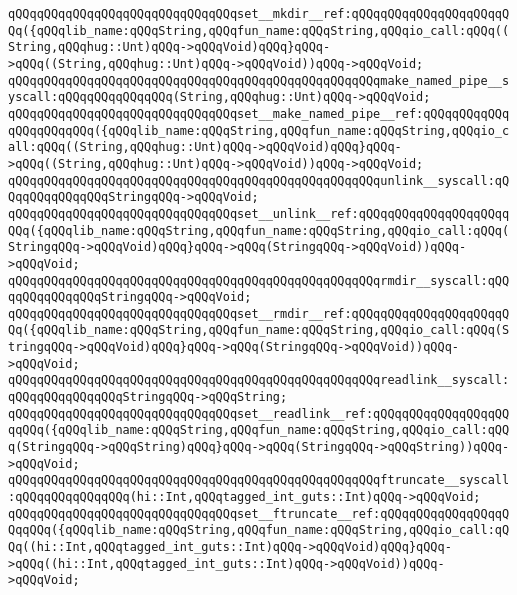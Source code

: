 \verb|qQQqqQQqqQQqqQQqqQQqqQQqqQQqqQQqset__mkdir__ref:qQQqqQQqqQQqqQQqqQQqqQQq({qQQqlib_name:qQQqString,qQQqfun_name:qQQqString,qQQqio_call:qQQq((String,qQQqhug::Unt)qQQq->qQQqVoid)qQQq}qQQq->qQQq((String,qQQqhug::Unt)qQQq->qQQqVoid))qQQq->qQQqVoid;|\newline
\newline
\verb|qQQqqQQqqQQqqQQqqQQqqQQqqQQqqQQqqQQqqQQqqQQqqQQqqQQqmake_named_pipe__syscall:qQQqqQQqqQQqqQQq(String,qQQqhug::Unt)qQQq->qQQqVoid;|\newline
\verb|qQQqqQQqqQQqqQQqqQQqqQQqqQQqqQQqset__make_named_pipe__ref:qQQqqQQqqQQqqQQqqQQqqQQq({qQQqlib_name:qQQqString,qQQqfun_name:qQQqString,qQQqio_call:qQQq((String,qQQqhug::Unt)qQQq->qQQqVoid)qQQq}qQQq->qQQq((String,qQQqhug::Unt)qQQq->qQQqVoid))qQQq->qQQqVoid;|\newline
\newline
\verb|qQQqqQQqqQQqqQQqqQQqqQQqqQQqqQQqqQQqqQQqqQQqqQQqqQQqunlink__syscall:qQQqqQQqqQQqqQQqStringqQQq->qQQqVoid;|\newline
\verb|qQQqqQQqqQQqqQQqqQQqqQQqqQQqqQQqset__unlink__ref:qQQqqQQqqQQqqQQqqQQqqQQq({qQQqlib_name:qQQqString,qQQqfun_name:qQQqString,qQQqio_call:qQQq(StringqQQq->qQQqVoid)qQQq}qQQq->qQQq(StringqQQq->qQQqVoid))qQQq->qQQqVoid;|\newline
\newline
\verb|qQQqqQQqqQQqqQQqqQQqqQQqqQQqqQQqqQQqqQQqqQQqqQQqqQQqrmdir__syscall:qQQqqQQqqQQqqQQqStringqQQq->qQQqVoid;|\newline
\verb|qQQqqQQqqQQqqQQqqQQqqQQqqQQqqQQqset__rmdir__ref:qQQqqQQqqQQqqQQqqQQqqQQq({qQQqlib_name:qQQqString,qQQqfun_name:qQQqString,qQQqio_call:qQQq(StringqQQq->qQQqVoid)qQQq}qQQq->qQQq(StringqQQq->qQQqVoid))qQQq->qQQqVoid;|\newline
\newline
\verb|qQQqqQQqqQQqqQQqqQQqqQQqqQQqqQQqqQQqqQQqqQQqqQQqqQQqreadlink__syscall:qQQqqQQqqQQqqQQqStringqQQq->qQQqString;|\newline
\verb|qQQqqQQqqQQqqQQqqQQqqQQqqQQqqQQqset__readlink__ref:qQQqqQQqqQQqqQQqqQQqqQQq({qQQqlib_name:qQQqString,qQQqfun_name:qQQqString,qQQqio_call:qQQq(StringqQQq->qQQqString)qQQq}qQQq->qQQq(StringqQQq->qQQqString))qQQq->qQQqVoid;|\newline
\newline
\verb|qQQqqQQqqQQqqQQqqQQqqQQqqQQqqQQqqQQqqQQqqQQqqQQqqQQqftruncate__syscall:qQQqqQQqqQQqqQQq(hi::Int,qQQqtagged_int_guts::Int)qQQq->qQQqVoid;|\newline
\verb|qQQqqQQqqQQqqQQqqQQqqQQqqQQqqQQqset__ftruncate__ref:qQQqqQQqqQQqqQQqqQQqqQQq({qQQqlib_name:qQQqString,qQQqfun_name:qQQqString,qQQqio_call:qQQq((hi::Int,qQQqtagged_int_guts::Int)qQQq->qQQqVoid)qQQq}qQQq->qQQq((hi::Int,qQQqtagged_int_guts::Int)qQQq->qQQqVoid))qQQq->qQQqVoid;|\newline

